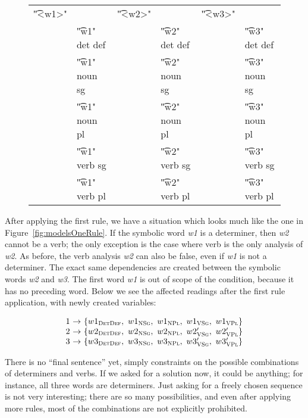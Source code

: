 \begin{figure}[h]
\centering
\begin{tabular}{p{0.6cm} l  p{0.6cm} l p{0.6cm} l }
\t{"<w1>"}    &                     &  \t{"<w2>"}  &           &  \t{"<w3>"}    \\
              & \t{"w1" det def}    & &      \t{"w2" det def}  & &  \t{"w3" det def} \\
              & \t{"w1" noun sg}    & &      \t{"w2" noun sg}  & &  \t{"w3" noun sg} \\
              & \t{"w1" noun pl}    & &      \t{"w2" noun pl}  & &  \t{"w3" noun pl} \\
              & \t{"w1" verb sg}    & &      \t{"w2" verb sg}  & &  \t{"w3" verb sg} \\
              & \t{"w1" verb pl}    & &      \t{"w2" verb pl}  & &  \t{"w3" verb pl} \\
\end{tabular}
\end{figure}

After applying the first rule, we have a situation which 
looks much like the one in Figure~\ref{fig:modelsOneRule}. 
If the symbolic word {\em w1} is a determiner, then {\em w2} cannot be a verb; 
the only exception is the case where verb is the only analysis of {\em w2}. 
As before, the verb analysis {\em w2} can also be false, even if {\em w1} 
is not a determiner. The exact same dependencies are created between the 
symbolic words {\em w2} and {\em w3}.
The first word {\em w1} is out of scope of the condition, because it has no preceding word. 
Below we see the affected readings after the first rule application, with newly created variables:

\begin{figure}[h]
$$\begin{array}{l @{~\rightarrow~} l}
1 & \{w1_{\detdef}, \  w1_{\noun\sg}, \  w1_{\noun\pl}, \ w1_{\verb\sg}, \ w1_{\verb\pl} \} \\
2 & \{w2_{\detdef}, \  w2_{\noun\sg}, \  w2_{\noun\pl}, \ w2'_{\verb\sg}, \ w2'_{\verb\pl} \} \\
3 & \{w3_{\detdef}, \  w3_{\noun\sg}, \  w3_{\noun\pl}, \ w3'_{\verb\sg}, \ w3'_{\verb\pl} \} \\
\end{array}$$
\end{figure}

There is no ``final sentence'' yet, simply constraints on the possible combinations of determiners and verbs. If we asked for a solution now, it could be anything; for instance, all three words are determiners. Just asking for a freely chosen sequence is not very interesting; there are so many possibilities, and even after applying more rules, most of the combinations are not explicitly prohibited. 

